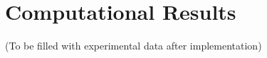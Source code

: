 \documentclass[12pt]{article}
\begin{document}
	\section{Computational Results}
	
	(To be filled with experimental data after implementation)
	
%			
%			
%			
%			
%			
%			
%			
%			
%			
%			
%			
	
\end{document}
